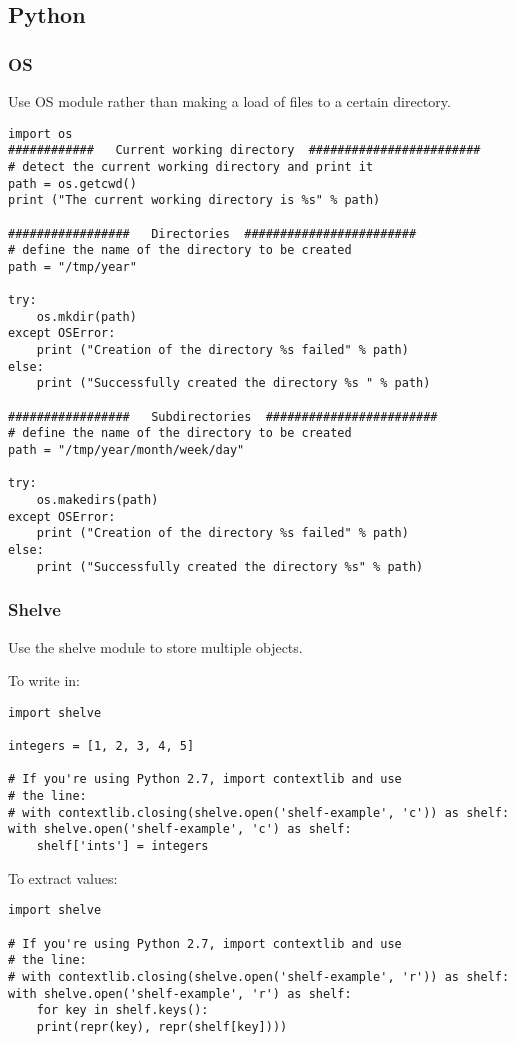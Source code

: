 \documentclass[11pt]{article}
\begin{document}
\subsection{Python}
\label{sec:org59d5140}
\subsubsection{OS}
\label{sec:org21cdcdc}
Use OS module rather than making a load of files to a certain directory. 
\begin{verbatim}
import os
############   Current working directory  ########################
# detect the current working directory and print it
path = os.getcwd()  
print ("The current working directory is %s" % path) 

#################   Directories  ########################
# define the name of the directory to be created
path = "/tmp/year"

try:  
    os.mkdir(path)
except OSError:  
    print ("Creation of the directory %s failed" % path)
else:  
    print ("Successfully created the directory %s " % path)

#################   Subdirectories  ########################
# define the name of the directory to be created
path = "/tmp/year/month/week/day"

try:  
    os.makedirs(path)
except OSError:  
    print ("Creation of the directory %s failed" % path)
else:  
    print ("Successfully created the directory %s" % path)
\end{verbatim}
\subsubsection{Shelve}
\label{sec:org5a8532b}
Use the shelve module to store multiple objects. 

To write in:
\begin{verbatim}
import shelve

integers = [1, 2, 3, 4, 5]

# If you're using Python 2.7, import contextlib and use
# the line:
# with contextlib.closing(shelve.open('shelf-example', 'c')) as shelf:
with shelve.open('shelf-example', 'c') as shelf:
    shelf['ints'] = integers
\end{verbatim}

To extract values:
\begin{verbatim}
import shelve

# If you're using Python 2.7, import contextlib and use
# the line:
# with contextlib.closing(shelve.open('shelf-example', 'r')) as shelf:
with shelve.open('shelf-example', 'r') as shelf:
    for key in shelf.keys():
	print(repr(key), repr(shelf[key])))
\end{verbatim}
\end{document}

